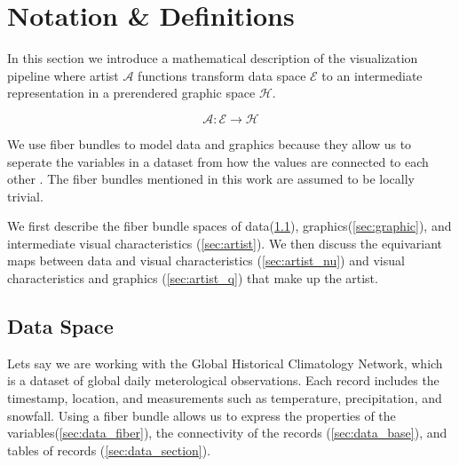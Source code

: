 \documentclass[../main.tex]{subfiles}
\begin{document}
\section{Notation \& Definitions}

In this section we introduce a mathematical description of the visualization pipeline where artist $\mathscr{A}$ functions transform data space $\mathscr{E}$ to an intermediate representation in a prerendered graphic space $\mathscr{H}$. 

\begin{equation}
    \label{eq:artist}
    \mathscr{A}: \mathscr{E} \rightarrow \mathscr{H}
\end{equation}

We use fiber bundles\cite{FiberBundle2020, rowlandFiberBundle} to model data and graphics because they allow us to seperate the variables in a dataset from how the values  are connected to each other \cite{butlerVisualizationModelBased1989,butlerVectorBundleClassesForm1992}. The fiber bundles mentioned in this work are assumed to be locally trivial\cite{spanier1989algebraic,LocallyTrivialFibre}. 

We first describe the fiber bundle spaces of data(\ref{sec:data}), graphics(\ref{sec:graphic}), and intermediate visual characteristics (\ref{sec:artist}). We then discuss the equivariant maps between data and visual characteristics (\ref{sec:artist_nu}) and visual characteristics and graphics (\ref{sec:artist_q}) that make up the artist.

\subsection{Data Space}
\label{sec:data}
Lets say we are working with the Global Historical Climatology Network\cite{AnOverviewoftheGlobalHistoricalClimatologyNetworkDailyDatabase}, which is a dataset of global daily meterological observations. Each record includes the timestamp, location, and measurements such as temperature, precipitation, and snowfall. Using a fiber bundle allows us to express the properties of the variables(\ref{sec:data_fiber}), the connectivity of the records (\ref{sec:data_base}), and tables of records (\ref{sec:data_section}).
\end{document}
